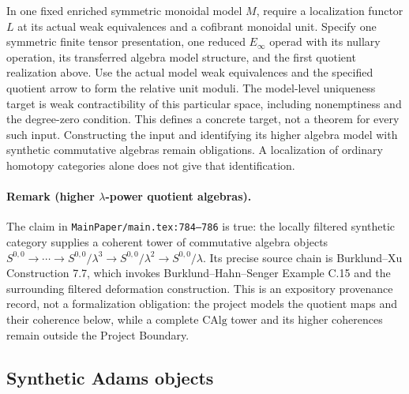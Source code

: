 \begin{definition}
  \label{def:lambda-quotient-operadic-target}
  In one fixed enriched symmetric monoidal model $M$, require a
  localization functor $L$ at its actual weak equivalences and a cofibrant
  monoidal unit. Specify one symmetric finite tensor presentation, one
  reduced $E_\infty$ operad with its nullary operation, its transferred
  algebra model structure, and the first quotient realization above.
  Use the actual model weak equivalences and the specified quotient
  arrow to form the relative unit moduli. The model-level uniqueness
  target is weak contractibility of this particular space, including
  nonemptiness and the degree-zero condition.
  This defines a concrete target, not a theorem for every such input.
  Constructing the input and identifying its higher algebra model with
  synthetic commutative algebras remain obligations. A localization of
  ordinary homotopy categories alone does not give that identification.
\end{definition}

\paragraph{Remark (higher $\lambda$-power quotient algebras).}
The claim in \texttt{MainPaper/main.tex:784--786} is true: the locally filtered
synthetic category supplies a coherent tower of commutative algebra objects
$S^{0,0}\to\cdots\to S^{0,0}/\lambda^3\to S^{0,0}/\lambda^2\to
S^{0,0}/\lambda$.  Its precise source chain is Burklund--Xu Construction 7.7,
which invokes Burklund--Hahn--Senger Example C.15 and the surrounding filtered
deformation construction.  This is an expository provenance record, not a
formalization obligation: the project models the quotient maps and their
coherence below, while a complete $\mathrm{CAlg}$ tower and its higher
coherences remain outside the Project Boundary.

\subsection{Synthetic Adams objects}


